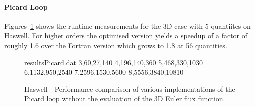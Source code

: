 \documentclass{acm_proc_article-sp}
\begin{document}
\paragraph{Picard Loop}
Figures~\ref{fig:resultsPicard} shows the runtime measurements for the 3D case with 5 quantiites on Haswell.
For higher orders the optimised version yields a speedup of a factor of roughly 1.6 over the Fortran version which grows to 1.8 at 56 quantities. 

\begin{figure}
\begin{filecontents}{resultsPicard.dat}
3,60,27,140
4,196,140,360
5,468,330,1030
6,1132,950,2540
7,2596,1530,5600
8,5556,3840,10810
\end{filecontents}
\pgfplotsset{scaled y ticks=false}
\caption{Haswell - Performance comparison of various implementations of the Picard loop without the evaluation of the 3D Euler flux function.}\label{fig:resultsPicard}
\end{figure}

  
\end{document}
